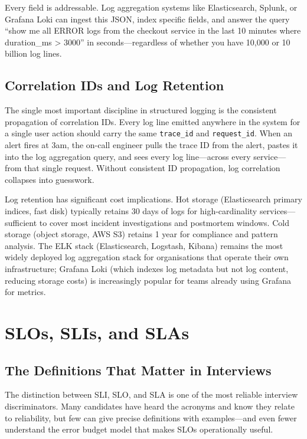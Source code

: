 \documentclass[11pt,a4paper]{article}
\begin{document}
Every field is addressable. Log aggregation systems like Elasticsearch, Splunk, or Grafana Loki can ingest this JSON, index specific fields, and answer the query ``show me all ERROR logs from the checkout service in the last 10 minutes where duration\_ms > 3000'' in seconds---regardless of whether you have 10,000 or 10 billion log lines.

\subsection{Correlation IDs and Log Retention}

The single most important discipline in structured logging is the consistent propagation of correlation IDs. Every log line emitted anywhere in the system for a single user action should carry the same \texttt{trace\_id} and \texttt{request\_id}. When an alert fires at 3am, the on-call engineer pulls the trace ID from the alert, pastes it into the log aggregation query, and sees every log line---across every service---from that single request. Without consistent ID propagation, log correlation collapses into guesswork.

Log retention has significant cost implications. Hot storage (Elasticsearch primary indices, fast disk) typically retains 30 days of logs for high-cardinality services---sufficient to cover most incident investigations and postmortem windows. Cold storage (object storage, AWS S3) retains 1 year for compliance and pattern analysis. The ELK stack (Elasticsearch, Logstash, Kibana) remains the most widely deployed log aggregation stack for organisations that operate their own infrastructure; Grafana Loki (which indexes log metadata but not log content, reducing storage costs) is increasingly popular for teams already using Grafana for metrics.

\section{SLOs, SLIs, and SLAs}

\subsection{The Definitions That Matter in Interviews}

The distinction between SLI, SLO, and SLA is one of the most reliable interview discriminators. Many candidates have heard the acronyms and know they relate to reliability, but few can give precise definitions with examples---and even fewer understand the error budget model that makes SLOs operationally useful.
\end{document}
